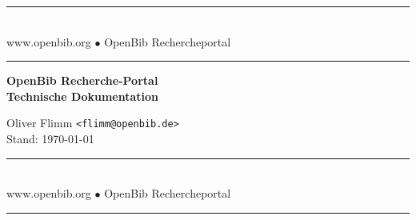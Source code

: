 \documentclass[11pt, twoside, a4paper, BCOR8mm, DIV12, bibtotoc,idxtotoc]{scrbook}
\begin{document}
\frontmatter

\begin{titlepage}

\begin{center}
\rule[-.1in]{16cm}{1mm}\\[3mm]
{\fontsize{20}{20pt}\selectfont
  www.openbib.org $\bullet$ OpenBib Rechercheportal}\\[-2mm]
\rule[-.1in]{16cm}{1mm}

\vspace{5cm}

  \textbf{\fontsize{30}{30pt}\selectfont OpenBib Recherche-Portal\\[3mm] Technische Dokumentation}

  \vspace{2cm}

  Oliver Flimm \texttt{<flimm@openbib.de>}\\
  Stand: \today

  \vspace{8cm}

\rule[-.1in]{16cm}{1mm}\\[3mm]
{\fontsize{20}{20pt}\selectfont
  www.openbib.org $\bullet$ OpenBib Rechercheportal}\\[-2mm]
\rule[-.1in]{16cm}{1mm}

\end{center}

\end{titlepage}






\tableofcontents
\end{document}
